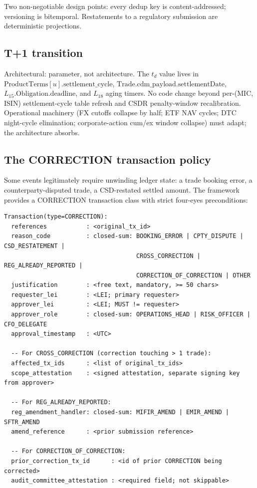 \documentclass[11pt,a4paper]{article}
\begin{document}
Two non-negotiable design points: every dedup key is content-addressed; versioning is bitemporal. Restatements to a regulatory submission are deterministic projections.

\subsection{T+1 transition}

Architectural: parameter, not architecture. The $t_d$ value lives in $\mathrm{ProductTerms}[u].\mathrm{settlement\_cycle}$, $\mathrm{Trade}.\mathrm{cdm\_payload}.\mathrm{settlementDate}$, $L_{15}.\mathrm{Obligation}.\mathrm{deadline}$, and $L_{18}$ aging timers. No code change beyond per-(MIC, ISIN) settlement-cycle table refresh and CSDR penalty-window recalibration. Operational machinery (FX cutoffs collapse by half; ETF NAV cycles; DTC night-cycle elimination; corporate-action cum/ex window collapse) must adapt; the architecture absorbs.

\subsection{The CORRECTION transaction policy}
\label{sec:accounting-correction}

Some events legitimately require unwinding ledger state: a trade booking error, a counterparty-disputed trade, a CSD-restated settled amount. The framework provides a CORRECTION transaction class with strict four-eyes preconditions:

\begin{lstlisting}
Transaction(type=CORRECTION):
  references           : <original_tx_id>
  reason_code          : closed-sum: BOOKING_ERROR | CPTY_DISPUTE | CSD_RESTATEMENT |
                                     CROSS_CORRECTION | REG_ALREADY_REPORTED |
                                     CORRECTION_OF_CORRECTION | OTHER
  justification        : <free text, mandatory, >= 50 chars>
  requester_lei        : <LEI; primary requester>
  approver_lei         : <LEI; MUST != requester>
  approver_role        : closed-sum: OPERATIONS_HEAD | RISK_OFFICER | CFO_DELEGATE
  approval_timestamp   : <UTC>

  -- For CROSS_CORRECTION (correction touching > 1 trade):
  affected_tx_ids      : <list of original_tx_ids>
  scope_attestation    : <signed attestation, separate signing key from approver>

  -- For REG_ALREADY_REPORTED:
  reg_amendment_handler: closed-sum: MIFIR_AMEND | EMIR_AMEND | SFTR_AMEND
  amend_reference      : <prior submission reference>

  -- For CORRECTION_OF_CORRECTION:
  prior_correction_tx_id      : <id of prior CORRECTION being corrected>
  audit_committee_attestation : <required field; not skippable>
\end{lstlisting}
\end{document}
